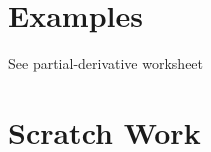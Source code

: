 \documentclass[11pt]{article}
\begin{document}
\section{Examples}

See partial-derivative worksheet


\newpage

\section{Scratch Work}
\end{document}
